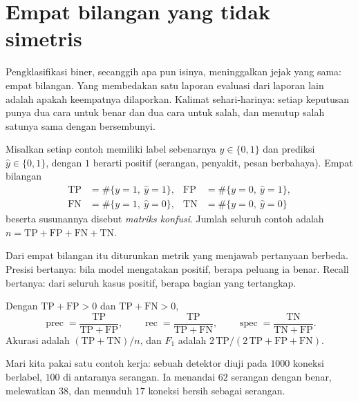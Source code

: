 \section{Empat bilangan yang tidak simetris}

Pengklasifikasi biner, secanggih apa pun isinya, meninggalkan jejak yang sama: empat
bilangan. Yang membedakan satu laporan evaluasi dari laporan lain adalah apakah keempatnya
dilaporkan. Kalimat sehari-harinya: setiap keputusan punya dua cara untuk benar dan dua
cara untuk salah, dan menutup salah satunya sama dengan bersembunyi.


\begin{definisi}
Misalkan setiap contoh memiliki label sebenarnya $y\in\{0,1\}$ dan prediksi
$\hat y\in\{0,1\}$, dengan $1$ berarti positif (serangan, penyakit, pesan berbahaya).
Empat bilangan
\begin{align}
\mathrm{TP}&=\#\{y=1,\ \hat y=1\}, & \mathrm{FP}&=\#\{y=0,\ \hat y=1\},
\nonumber\\
\mathrm{FN}&=\#\{y=1,\ \hat y=0\}, & \mathrm{TN}&=\#\{y=0,\ \hat y=0\}
\nonumber
\end{align}
beserta susunannya disebut \emph{matriks konfusi}. Jumlah seluruh contoh adalah
$n=\mathrm{TP}+\mathrm{FP}+\mathrm{FN}+\mathrm{TN}$.
\end{definisi}

Dari empat bilangan itu diturunkan metrik yang menjawab pertanyaan berbeda. Presisi
bertanya: bila model mengatakan positif, berapa peluang ia benar. Recall bertanya: dari
seluruh kasus positif, berapa bagian yang tertangkap.

\begin{definisi}
Dengan $\mathrm{TP}+\mathrm{FP}>0$ dan $\mathrm{TP}+\mathrm{FN}>0$,
\[
\operatorname{prec}=\frac{\mathrm{TP}}{\mathrm{TP}+\mathrm{FP}},\qquad
\operatorname{rec}=\frac{\mathrm{TP}}{\mathrm{TP}+\mathrm{FN}},\qquad
\operatorname{spec}=\frac{\mathrm{TN}}{\mathrm{TN}+\mathrm{FP}} .
\]
Akurasi adalah $(\mathrm{TP}+\mathrm{TN})/n$, dan $F_1$ adalah
$2\,\mathrm{TP}/(2\,\mathrm{TP}+\mathrm{FP}+\mathrm{FN})$.
\end{definisi}

Mari kita pakai satu contoh kerja: sebuah detektor diuji pada $1000$ koneksi berlabel,
$100$ di antaranya serangan. Ia menandai $62$ serangan dengan benar, melewatkan
$38$, dan menuduh $17$ koneksi bersih sebagai serangan.


